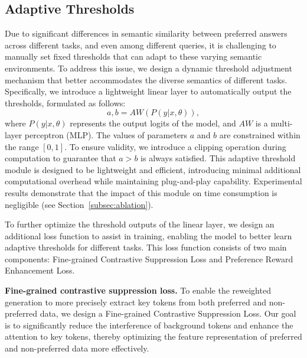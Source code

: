 \subsection{Adaptive Thresholds}
\label{subsec:adaptive_thresholds}
Due to significant differences in semantic similarity between preferred answers across different tasks, and even among different queries, it is challenging to manually set fixed thresholds that can adapt to these varying semantic environments. To address this issue, we design a dynamic threshold adjustment mechanism that better accommodates the diverse semantics of different tasks. Specifically, we introduce a lightweight linear layer to automatically output the thresholds, formulated as follows:
\begin{equation}
  a, b = AW(P(y | x, \theta)),
\end{equation}
where $P(y | x, \theta)$ represents the output logits of the model, and $AW$ is a multi-layer perceptron (MLP). The values of parameters $a$ and $b$ are constrained within the range $[0, 1]$. To ensure validity, we introduce a clipping operation during computation to guarantee that $a > b$ is always satisfied.
This adaptive threshold module is designed to be lightweight and efficient, introducing minimal additional computational overhead while maintaining plug-and-play capability. Experimental results demonstrate that the impact of this module on time consumption is negligible (see Section~\ref{subsec:ablation}).

To further optimize the threshold outputs of the linear layer, we design an additional loss function to assist in training, enabling the model to better learn adaptive thresholds for different tasks. This loss function consists of two main components: Fine-grained Contrastive Suppression Loss and Preference Reward Enhancement Loss.

\textbf{Fine-grained contrastive suppression loss.}
To enable the reweighted generation to more precisely extract key tokens from both preferred and non-preferred data, we design a Fine-grained Contrastive Suppression Loss. Our goal is to significantly reduce the interference of background tokens and enhance the attention to key tokens, thereby optimizing the feature representation of preferred and non-preferred data more effectively.


